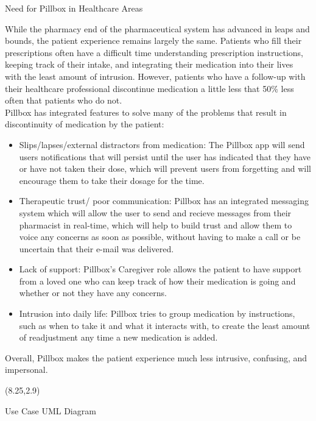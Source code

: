 \documentclass[22pt]{beamer}
\begin{document}
\begin{frame}[fragile]
\begin{textblock}{7.25}
\begin{block}{Need for Pillbox in Healthcare Areas}
\end{block}
While the pharmacy end of the pharmaceutical system has advanced in leaps and bounds, the patient experience remains largely the same. Patients who fill their prescriptions often have a difficult time understanding prescription instructions, keeping track of their intake, and integrating their medication into their lives with the least amount of intrusion. However, patients who have a follow-up with their healthcare professional discontinue medication a little less that 50\% \cite{selmesmitchell2007} less often that patients who do not.\\
Pillbox has integrated features to solve many of the problems that result in discontinuity of medication by the patient:
\begin{itemize}
\item Slips/lapses/external distractors from medication: The Pillbox app will send users notifications that will persist until the user has indicated that they have or have not taken their dose, which will prevent users from forgetting and will encourage them to take their dosage for the time.
\item Therapeutic trust/ poor communication: Pillbox has an integrated messaging system which will allow the user to send and recieve messages from their pharmacist in real-time, which will help to build trust and allow them to voice any concerns as soon as possible, without having to make a call or be uncertain that their e-mail was delivered.
\item Lack of support: Pillbox's Caregiver role allows the patient to have support from a loved one who can keep track of how their medication is going and whether or not they have any concerns.
\item Intrusion into daily life: Pillbox tries to group medication by instructions, such as when to take it and what it interacts with, to create the least amount of readjustment any time a new medication is added.
\end{itemize}
Overall, Pillbox makes the patient experience much less intrusive, confusing, and impersonal.
\end{textblock}



\begin{textblock}{7.25}(8.25,2.9)

\begin{block}{Use Case UML Diagram}


\end{block}
\end{textblock}
\end{frame}
\end{document}
